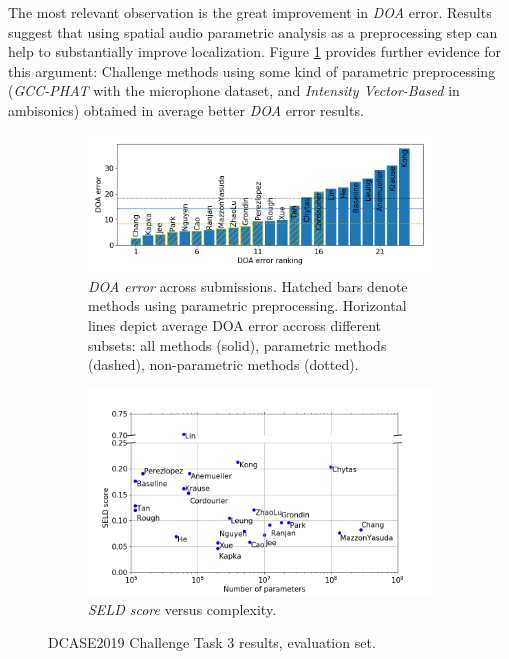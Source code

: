 The most relevant observation is the great improvement in \textit{DOA} error. Results suggest that using spatial audio parametric analysis as a preprocessing step can help to substantially improve localization. 
Figure \ref{fig:5a} provides further evidence for this argument: Challenge methods using some kind of parametric preprocessing (\textit{GCC-PHAT} with the microphone dataset, and \textit{Intensity Vector-Based} in ambisonics) obtained in average better \textit{DOA} error results.

\begin{figure}
  \begin{subfigure}[b]{\textwidth}
    \includegraphics[width=\textwidth]{Figures/SELD//doaerror2.jpg}
    \caption{\textit{DOA error} across submissions. Hatched bars denote methods using parametric preprocessing. Horizontal lines depict average DOA error accross different subsets: all methods (solid), parametric methods (dashed), non-parametric methods (dotted).}
    \label{fig:5a}
  \end{subfigure}
  \begin{subfigure}[b]{\textwidth}
    \includegraphics[width=\textwidth]{Figures/SELD//complexity_vs_seld2.jpg}
    \caption{\textit{SELD score} versus complexity.}
    \label{fig:5b}
  \end{subfigure}
\caption{DCASE2019 Challenge Task 3 results, evaluation set.}
\end{figure}

